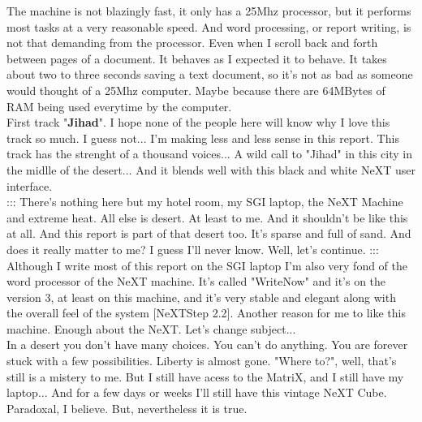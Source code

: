 \documentclass[11pt,twoside,a4paper]{book}
\begin{document}
\begin{multicols*}{2}
The machine is not blazingly fast, it only has a 25Mhz processor, but it performs most tasks at a very reasonable speed. And word processing, or report writing, is not that demanding from the processor. Even when I scroll back and forth between pages of a document. It behaves as I expected it to behave. It takes about two to three seconds saving a text document, so it's not as bad as someone would thought of a 25Mhz computer. Maybe because there are 64MBytes of RAM being used everytime by the computer. ~\\

First track "\textbf{Jihad}". I hope none of the people here will know why I love this track so much. I guess not... I'm making less and less sense in this report. This track has the strenght of a thousand voices... A wild call to "Jihad" in this city in the midlle of the desert... And it blends well with this black and white NeXT user interface. ~\\

::: There's nothing here but my hotel room, my SGI laptop, the NeXT Machine and extreme heat. All else is desert. At least to me. And it shouldn't be like this at all. And this report is part of that desert too. It's sparse and full of sand. And does it really matter to me? I guess I'll never know. Well, let's continue. ::: ~\\

Although I write most of this report on the SGI laptop I'm also very fond of the word processor of the NeXT machine. It's called "WriteNow" and it's on the version 3, at least on this machine, and it's very stable and elegant along with the overall feel of the system [NeXTStep 2.2]. Another reason for me to like this machine. Enough about the NeXT. Let's change subject... ~\\

In a desert you don't have many choices. You can't do anything. You are forever stuck with a few possibilities. Liberty is almost gone. "Where to?", well, that's still is a mistery to me. But I still have acess to the MatriX, and I still have my laptop... And for a few days or weeks I'll still have this vintage NeXT Cube. Paradoxal, I believe. But, nevertheless it is true. ~\\


\end{multicols*}
\end{document}
